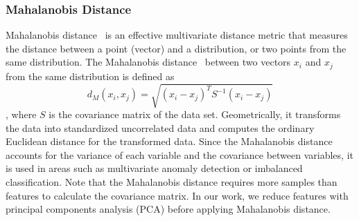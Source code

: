 \documentclass[conference]{IEEEtran}
\begin{document}
\subsubsection{Mahalanobis Distance}
Mahalanobis distance~\cite{Mah} is an effective multivariate distance metric that measures the distance between a point (vector) and a distribution, or two points from the same distribution. 
The Mahalanobis distance~\cite{Mah} between two vectors $x_i$ and $x_j$ from the same distribution is defined as
\begin{equation}d_{M}(x_i, x_j)=\sqrt{(x_i-x_j)^{T} S^{-1}(x_i-x_j)}
\end{equation}, where $S$ is the covariance matrix of the data set. Geometrically, it transforms the data into standardized uncorrelated data and computes the ordinary Euclidean distance for the transformed data. Since the Mahalanobis distance accounts for the variance of each variable and the covariance between variables, it is used in areas such as multivariate anomaly detection or imbalanced classification. Note that the Mahalanobis distance requires more samples than features to calculate the covariance matrix. In our work, we reduce features with principal components analysis (PCA) before applying Mahalanobis distance.
\end{document}
